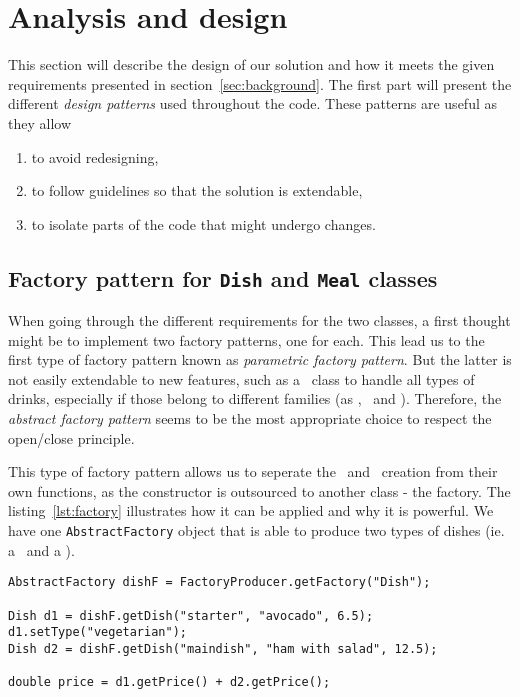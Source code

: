 \section{Analysis and design} %
\label{sec:analysis_and_design}
This section will describe the design of our solution and how
it meets the given requirements presented in section~\ref{sec:background}.
The first part will present the different \emph{design patterns}
used throughout the code.
These patterns are useful as they allow
\begin{enumerate}
  \item to avoid redesigning,
  \item to follow guidelines so that the solution is extendable,
  \item to isolate parts of the code that might undergo changes.
\end{enumerate}

\subsection{Factory pattern for \texttt{Dish} and \texttt{Meal} classes} %
\label{sub:factory_pattern_for_the_texttt_dish_and_texttt_meal_classes}
When going through the different requirements for the two classes, a first thought
might be to implement two factory patterns, one for each.
This lead us to the first type of factory pattern known as \emph{parametric factory pattern}.
But the latter is not easily extendable to new features, such as
a \Drink~class to handle all types of drinks, especially if
those belong to different families (as \Dish, \Meal~and \Drink).
Therefore, the \emph{abstract factory pattern} seems to be the
most appropriate choice to respect the open/close principle.

This type of factory pattern allows us to seperate the \Dish~and \Meal~creation from their own functions, 
as the constructor is outsourced to another class - the factory.
The listing~\ref{lst:factory} illustrates how it can be applied and why it is powerful.
We have one \lstinline|AbstractFactory| object that is able to produce
two types of dishes (ie. a \Starter~and a \MainDish).

\begin{lstlisting}[caption=Factory pattern for \Dish~and \Meal.,
label=lst:factory]
AbstractFactory dishF = FactoryProducer.getFactory("Dish");

Dish d1 = dishF.getDish("starter", "avocado", 6.5);
d1.setType("vegetarian");
Dish d2 = dishF.getDish("maindish", "ham with salad", 12.5);

double price = d1.getPrice() + d2.getPrice();
\end{lstlisting}

